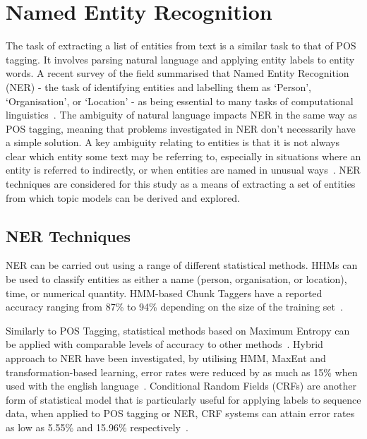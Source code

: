 \documentclass[10pt]{report}
\begin{document}
\newpage
\section{Named Entity Recognition}
The task of extracting a list of entities from text is a similar task to that of POS tagging. It involves parsing natural language and applying entity labels to entity words. A recent survey of the field summarised that Named Entity Recognition (NER) - the task of identifying entities and labelling them as ‘Person’, ‘Organisation’, or ‘Location’ - as being essential to many tasks of computational linguistics~\cite{Nadeau2007-tp}. The ambiguity of natural language impacts NER in the same way as POS tagging, meaning that problems investigated in NER don't necessarily have a simple solution. A key ambiguity relating to entities is that it is not always clear which entity some text may be referring to, especially in situations where an entity is referred to indirectly, or when entities are named in unusual ways~\cite{Ratinov2009-gw}. NER techniques are considered for this study as a means of extracting a set of entities from which topic models can be derived and explored. 

\subsection{NER Techniques}
NER can be carried out using a range of different statistical methods. HHMs can be used to classify entities as either a name (person, organisation, or location), time, or numerical quantity. HMM-based Chunk Taggers have a reported accuracy ranging from 87\% to 94\% depending on the size of the training set~\cite{Zhou2002-st}.

Similarly to POS Tagging, statistical methods based on Maximum Entropy can be applied with comparable levels of accuracy to other methods~\cite{Borthwick1999-tg,Bender2003-lc}. Hybrid approach to NER have been investigated, by utilising HMM, MaxEnt and transformation-based learning, error rates were reduced by as much as 15\% when used with the english language~\cite{Tjong_Kim2003-ym}. Conditional Random Fields (CRFs) are another form of statistical model that is particularly useful for applying labels to sequence data, when applied to POS tagging or NER, CRF systems can attain error rates as low as 5.55\% and 15.96\% respectively~\cite{Lafferty2001-ab,McCallum2003-yu}.
\end{document}
